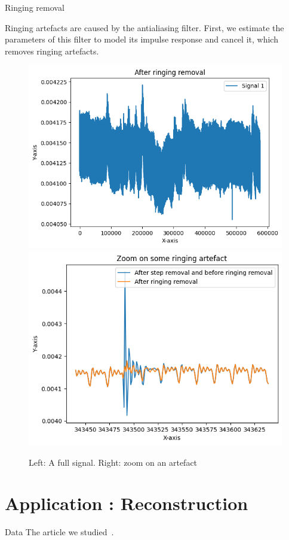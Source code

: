 \documentclass[10pt,serif]{beamer}
\begin{document}
\begin{frame}{Ringing removal}

    Ringing artefacts are caused by the antialiasing filter. First, we estimate the parameters of this filter to model its impulse response and cancel it, which removes ringing artefacts.
    \begin{figure}
        \centering
        \includegraphics[width=.4\textwidth]{figures/ringing_removal_real.png}
        \includegraphics[width=.4\textwidth]{figures/ringin_removal_zoom.png}
        \caption{Left: A full signal. Right: zoom on an artefact}
        \label{fig:data}
    \end{figure}
\end{frame}


\section[\color{white} Application]{Application : Reconstruction}\label{sec:results}

\begin{frame}{Data}
    The article we studied~\textcite{DECHEVEIGNE2018}.


\end{frame}
\end{document}
